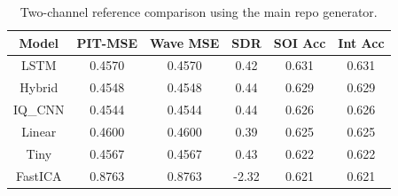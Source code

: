 \begin{table}[t]
\centering
\caption{Two-channel reference comparison using the main repo generator.}
\label{tab:phase2_two_channel_reference}
\begin{tabular}{|c|c|c|c|c|c|}
\hline
Model & PIT-MSE & Wave MSE & SDR & SOI Acc & Int Acc \\ 
\hline
LSTM & 0.4570 & 0.4570 & 0.42 & 0.631 & 0.631 \\ 
Hybrid & 0.4548 & 0.4548 & 0.44 & 0.629 & 0.629 \\ 
IQ\_CNN & 0.4544 & 0.4544 & 0.44 & 0.626 & 0.626 \\ 
Linear & 0.4600 & 0.4600 & 0.39 & 0.625 & 0.625 \\ 
Tiny & 0.4567 & 0.4567 & 0.43 & 0.622 & 0.622 \\ 
FastICA & 0.8763 & 0.8763 & -2.32 & 0.621 & 0.621 \\ 
\hline
\end{tabular}
\end{table}
